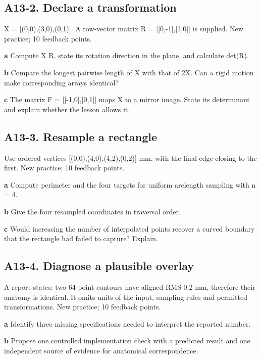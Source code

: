 \documentclass[11pt,letterpaper]{article}
\theoremstyle{definition}\newtheorem{definition}{Definition}\newtheorem{example}{Example}
\numberwithin{equation}{section}
\begin{document}
\par\noindent\begin{minipage}{\linewidth}
\subsection*{A13-2. Declare a transformation}
X =\allowbreak{} [(0,0),(3,0),(0,1)]. A row-vector matrix R =\allowbreak{} [[0,-1],[1,0]] is supplied. New practice; 10 feedback points.

\textbf{a} Compute X R, state its rotation direction in the plane, and calculate det(R).

\end{minipage}\par\medskip
\textbf{b} Compare the longest pairwise length of X with that of 2X. Can a rigid motion make corresponding arrays identical?

\textbf{c} The matrix F =\allowbreak{} [[-1,0],[0,1]] maps X to a mirror image. State its determinant and explain whether the lesson allows it.

\par\noindent\begin{minipage}{\linewidth}
\subsection*{A13-3. Resample a rectangle}
Use ordered vertices [(0,0),(4,0),(4,2),(0,2)] mm, with the final edge closing to the first. New practice; 10 feedback points.

\textbf{a} Compute perimeter and the four targets for uniform arclength sampling with n =\allowbreak{} 4.

\end{minipage}\par\medskip
\textbf{b} Give the four resampled coordinates in traversal order.

\textbf{c} Would increasing the number of interpolated points recover a curved boundary that the rectangle had failed to capture? Explain.

\par\noindent\begin{minipage}{\linewidth}
\subsection*{A13-4. Diagnose a plausible overlay}
A report states: two 64-point contours have aligned RMS 0.2 mm, therefore their anatomy is identical. It omits units of the input, sampling rules and permitted transformations. New practice; 10 feedback points.

\textbf{a} Identify three missing specifications needed to interpret the reported number.

\end{minipage}\par\medskip
\textbf{b} Propose one controlled implementation check with a predicted result and one independent source of evidence for anatomical correspondence.
\end{document}
